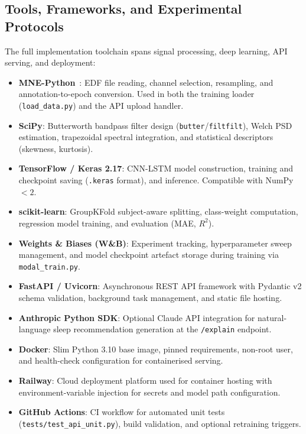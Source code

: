 \documentclass[10pt]{article}
\begin{document}
\subsection{Tools, Frameworks, and Experimental Protocols}
\label{sec:tools}

The full implementation toolchain spans signal processing, deep learning, API serving, and deployment:

\begin{itemize}
  \item \textbf{MNE-Python}~\cite{gramfort2013meg}: EDF file reading, channel selection, resampling, and annotation-to-epoch conversion. Used in both the training loader (\texttt{load\_data.py}) and the API upload handler.
  \item \textbf{SciPy}: Butterworth bandpass filter design (\texttt{butter}/\texttt{filtfilt}), Welch PSD estimation, trapezoidal spectral integration, and statistical descriptors (skewness, kurtosis).
  \item \textbf{TensorFlow / Keras 2.17}: CNN-LSTM model construction, training and checkpoint saving (\texttt{.keras} format), and inference. Compatible with NumPy~$<2$.
  \item \textbf{scikit-learn}: GroupKFold subject-aware splitting, class-weight computation, regression model training, and evaluation (MAE, $R^2$).
  \item \textbf{Weights \& Biases (W\&B)}: Experiment tracking, hyperparameter sweep management, and model checkpoint artefact storage during training via \texttt{modal\_train.py}.
  \item \textbf{FastAPI / Uvicorn}: Asynchronous REST API framework with Pydantic v2 schema validation, background task management, and static file hosting.
  \item \textbf{Anthropic Python SDK}: Optional Claude API integration for natural-language sleep recommendation generation at the \texttt{/explain} endpoint.
  \item \textbf{Docker}: Slim Python 3.10 base image, pinned requirements, non-root user, and health-check configuration for containerised serving.
  \item \textbf{Railway}: Cloud deployment platform used for container hosting with environment-variable injection for secrets and model path configuration.
  \item \textbf{GitHub Actions}: CI workflow for automated unit tests (\texttt{tests/test\_api\_unit.py}), build validation, and optional retraining triggers.
\end{itemize}
\end{document}
